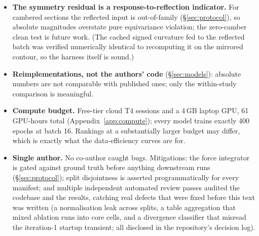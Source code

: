 \begin{itemize}
        $\Rey=7\times10^6$ run at $M\approx0.32$, past the usual
        incompressible limit; solver and surrogate are both incompressible,
        so the comparison is internally consistent, but absolute coefficients
        there carry that caveat.
  \item \textbf{The symmetry residual is a response-to-reflection indicator.}
        For cambered sections the reflected input is out-of-family
        (\S\ref{sec:protocol}), so absolute magnitudes overstate pure
        equivariance violation; the zero-camber clean test is future work.
        (The cached signed curvature fed to the reflected batch was verified
        numerically identical to recomputing it on the mirrored contour, so
        the harness itself is sound.)
  \item \textbf{Reimplementations, not the authors' code}
        (\S\ref{sec:models}): absolute numbers are not comparable with
        published ones; only the within-study comparison is meaningful.
  \item \textbf{Compute budget.} Free-tier cloud T4 sessions and a 4\,GB
        laptop GPU, 61 GPU-hours total (Appendix~\ref{app:compute}); every
        model trains exactly 400 epochs at batch 16. Rankings at a
        substantially larger budget may differ, which is exactly what the
        data-efficiency curves are for.
  \item \textbf{Single author.} No co-author caught bugs. Mitigations: the
        force integrator is gated against ground truth before anything
        downstream runs (\S\ref{sec:protocol}); split disjointness is
        asserted programmatically for every manifest; and multiple
        independent automated review passes audited the codebase and the
        results, catching real defects that were fixed before this text was
        written (a normalisation leak across splits, a table aggregation that
        mixed ablation runs into core cells, and a divergence classifier that
        misread the iteration-1 startup transient; all disclosed in the
        repository's decision log).
\end{itemize}

